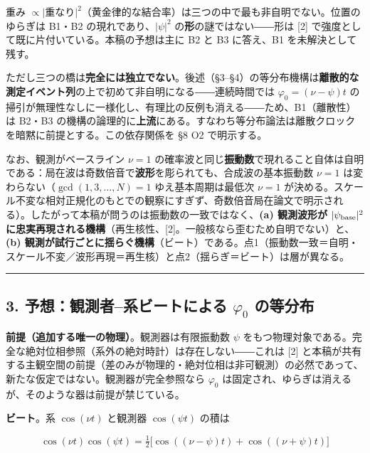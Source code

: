 \documentclass[
]{ltjsarticle}
\begin{document}
重み
\(\propto|\)重なり\(|^2\)（黄金律的な結合率）は三つの中で最も非自明でない。位置のゆらぎは
B1・B2 の現れであり、\(|\psi|^2\) の\textbf{形}の謎ではない――形は
{[}2{]} で強度として既に片付いている。本稿の予想は主に B2 と B3
に答え、B1 を未解決として残す。

ただし三つの橋は\textbf{完全には独立でない}。後述（§3--§4）の等分布機構は\textbf{離散的な測定イベント列}の上で初めて非自明になる――連続時間では
\(\varphi_0=(\nu-\psi)t\)
の掃引が無理性なしに一様化し、有理比の反例も消える――ため、B1（離散性）は
B2・B3
の機構の論理的に\textbf{上流}にある。すなわち等分布論法は離散クロックを暗黙に前提とする。この依存関係を
§8 O2 で明示する。

なお、観測がベースライン \(\nu=1\)
の確率波と同じ\textbf{振動数}で現れること自体は自明である：局在波は奇数倍音で\textbf{波形}を彫られても、合成波の基本振動数
\(\nu=1\) は変わらない（\(\gcd(1,3,\dots,N)=1\) ゆえ基本周期は最低次
\(\nu=1\)
が決める。スケール不変な相対正規化のもとでの観察にすぎず、奇数倍音局在論文で明示される）。したがって本稿が問うのは振動数の一致ではなく、\textbf{(a)
観測波形が \(|\psi_{\rm base}|^2\)
に忠実再現される機構}（再生核性、{[}2{]}。一般核なら歪むため自明でない）と、\textbf{(b)
観測が試行ごとに揺らぐ機構}（ビート）である。点1（振動数一致＝自明・スケール不変／波形再現＝再生核）と点2（揺らぎ＝ビート）は層が異なる。

\begin{center}\rule{0.5\linewidth}{0.5pt}\end{center}

\subsection{\texorpdfstring{3. 予想：観測者--系ビートによる
\(\varphi_0\)
の等分布}{3. 予想：観測者--系ビートによる \textbackslash varphi\_0 の等分布}}\label{ux4e88ux60f3ux89b3ux6e2cux8005ux7cfbux30d3ux30fcux30c8ux306bux3088ux308b-varphi_0-ux306eux7b49ux5206ux5e03}

\textbf{前提（追加する唯一の物理）}。観測器は有限振動数 \(\psi\)
をもつ物理対象である。完全な絶対位相参照（系外の絶対時計）は存在しない――これは
{[}2{]}
と本稿が共有する主観空間の前提（差のみが物理的・絶対位相は非可観測）の必然であって、新たな仮定ではない。観測器が完全参照なら
\(\varphi_0\)
は固定され、ゆらぎは消えるが、そのような器は前提が禁じている。

\textbf{ビート}。系 \(\cos(\nu t)\) と観測器 \(\cos(\psi t)\) の積は

\[
\cos(\nu t)\cos(\psi t)=\tfrac12\big[\cos((\nu-\psi)t)+\cos((\nu+\psi)t)\big]
\]
\end{document}
